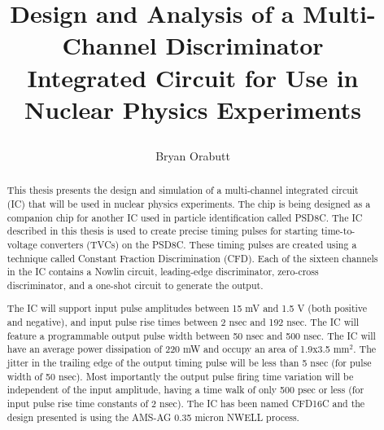 \documentclass[12pt,oneside,final]{siuethesis}
\author{Bryan Orabutt}
\title{\protect\parbox{\textwidth}{\protect\centering Design and Analysis of a Multi-Channel Discriminator\protect\\ Integrated Circuit for Use in Nuclear Physics Experiments}}
\theoremstyle{definition}
\begin{document}
\maketitle 

\frontmatter %

\copyrightpage %


\begin{abstract}

\par This thesis presents the design and simulation of a multi-channel integrated circuit (IC) that will be used in nuclear physics experiments. The chip is being designed as a companion chip for another IC used in particle identification called PSD8C. The IC described in this thesis is used to create precise timing pulses for starting time-to-voltage converters (TVCs) on the PSD8C. These timing pulses are created using a technique called Constant Fraction Discrimination (CFD). Each of the sixteen channels in the IC contains a Nowlin circuit, leading-edge discriminator, zero-cross discriminator, and a one-shot circuit to generate the output. 
\par The IC will support input pulse amplitudes between 15 mV and 1.5 V (both positive and negative), and input pulse rise times between 2 nsec and 192 nsec. The IC will feature a programmable output pulse width between 50 nsec and 500 nsec. The IC will have an average power dissipation of 220 mW and occupy an area of 1.9x3.5 mm$^{2}$. The jitter in the trailing edge of the output timing pulse will be less than 5 nsec (for pulse width of 50 nsec). Most importantly the output pulse firing time variation will be independent of the input amplitude, having a time walk of only 500 psec or less (for input pulse rise time constants of 2 nsec). The IC has been named CFD16C and the design presented is using the AMS-AG 0.35 micron NWELL process.
\end{abstract}


\end{document}
